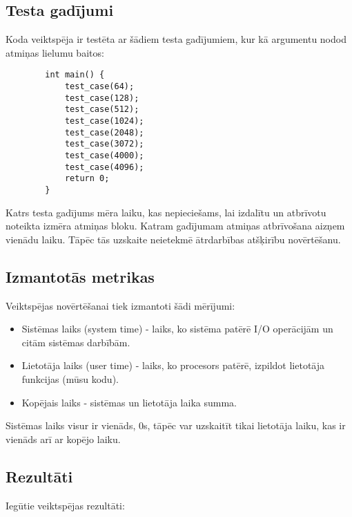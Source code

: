 \documentclass{article}
\begin{document}
	\subsection{Testa gadījumi}
	
	Koda veiktspēja ir testēta ar šādiem testa gadījumiem, kur kā argumentu nodod atmiņas lielumu baitos:
	
	\begin{verbatim}
		int main() {
			test_case(64);
			test_case(128);
			test_case(512);
			test_case(1024);
			test_case(2048); 
			test_case(3072); 
			test_case(4000); 
			test_case(4096); 
			return 0;
		}
	\end{verbatim}
	
	Katrs testa gadījums mēra laiku, kas nepieciešams, lai izdalītu un atbrīvotu noteikta izmēra atmiņas bloku. Katram gadījumam atmiņas atbrīvošana aizņem vienādu laiku. Tāpēc tās uzskaite neietekmē ātrdarbības atšķirību novērtēšanu.
	
	\subsection{Izmantotās metrikas}
	
	Veiktspējas novērtēšanai tiek izmantoti šādi mērījumi:
	
	\begin{itemize}
		\item Sistēmas laiks (system time) - laiks, ko sistēma patērē I/O operācijām un citām sistēmas darbībām.
		\item Lietotāja laiks (user time) - laiks, ko procesors patērē, izpildot lietotāja funkcijas (mūsu kodu).
		\item Kopējais laiks - sistēmas un lietotāja laika summa.
	\end{itemize}
	
	Sistēmas laiks visur ir vienāds, 0s, tāpēc var uzskaitīt tikai lietotāja laiku, kas ir vienāds arī ar kopējo laiku.
	
	\subsection{Rezultāti}
	
	Iegūtie veiktspējas rezultāti:
	
\end{document}
